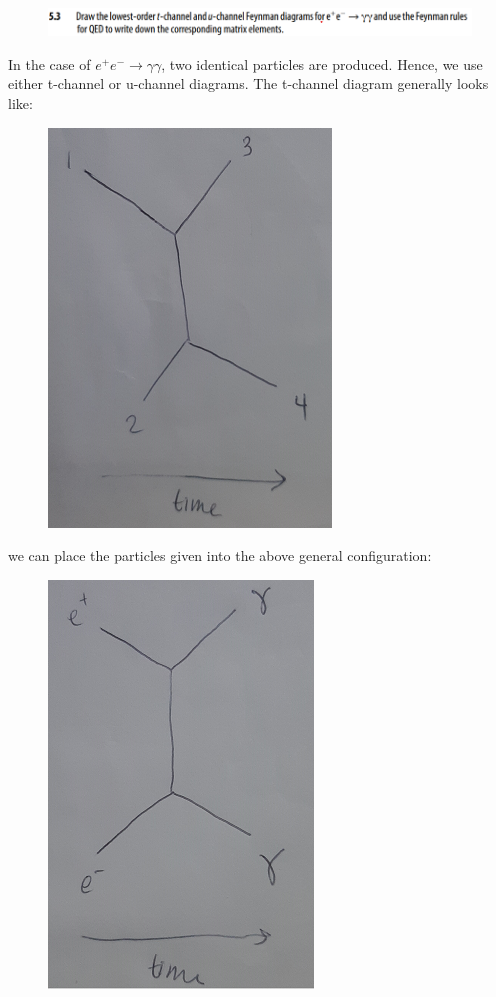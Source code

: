 \documentclass[11pt]{article}
\theoremstyle{definition}
\begin{document}
\newpage

\begin{figure}[H]
    \centering
    \includegraphics[scale = 0.55]{5.3.png}
\end{figure}

In the case of $e^{+}e^{-}\to\gamma\gamma$, two identical particles are produced. Hence, we use either t-channel or u-channel diagrams. The t-channel diagram generally looks like:

\begin{figure}[H]
    \centering
    \includegraphics[scale = 0.4]{general t-channel.png}
\end{figure}

we can place the particles given into the above general configuration:

\begin{figure}[H]
    \centering
    \includegraphics[scale = 0.4]{t-channel with particles.png}
\end{figure}
\end{document}

